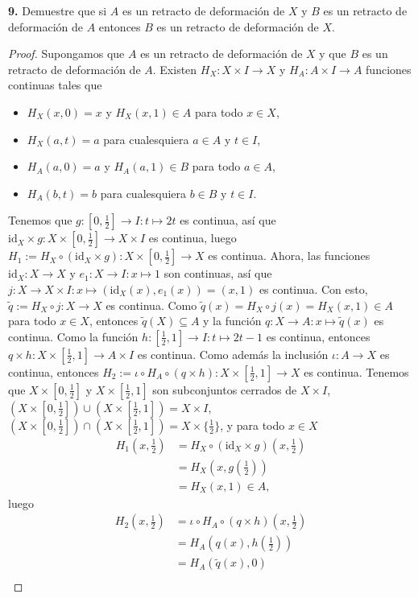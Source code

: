 \textbf{9.} Demuestre que si $A$ es un retracto de deformación de $X$ y $B$ es un retracto de deformación de $A$ entonces $B$ es un retracto de deformación de $X$.
\begin{proof}
Supongamos que $A$ es un retracto de deformación de $X$ y que $B$ es un retracto de deformación de $A$. Existen $H_X:X\times I\to X$ y $H_A:A\times I\to A$ funciones continuas tales que
\begin{itemize}
\item $H_X(x,0)=x$ y $H_X(x,1)\in A$ para todo $x\in X$,
\item $H_X(a,t)=a$ para cualesquiera $a\in A$ y $t\in I$,
\item $H_A(a,0)=a$ y $H_A(a,1)\in B$ para todo $a\in A$,
\item $H_A(b,t)=b$ para cualesquiera $b\in B$ y $t\in I$.
\end{itemize}
Tenemos que $g:[0,\tfrac12]\to I:t\mapsto 2t$ es continua, así que $\mathrm{id}_X\times g:X\times[0,\tfrac12]\to X\times I$ es continua, luego $H_1:=H_X\circ(\mathrm{id}_X\times g):X\times[0,\tfrac12]\to X$ es continua. Ahora, las funciones $\mathrm{id}_X:X\to X$ y $e_1:X\to I:x\mapsto 1$ son continuas, así que $j:X\to X\times I:x\mapsto(\mathrm{id}_X(x),e_1(x))=(x,1)$ es continua. Con esto, $\widetilde{q}:=H_X\circ j:X\to X$ es continua. Como $\widetilde{q}(x)=H_X\circ j(x)=H_X(x,1)\in A$ para todo $x\in X$, entonces $\widetilde{q}(X)\subseteq A$ y la función $q:X\to A:x\mapsto\widetilde{q}(x)$ es continua. Como la función $h:[\tfrac12,1]\to I:t\mapsto 2t-1$ es continua, entonces $q\times h:X\times[\tfrac12,1]\to A\times I$ es continua. Como además la inclusión $\iota:A\to X$ es continua, entonces $H_2:=\iota\circ H_A\circ(q\times h):X\times[\tfrac12,1]\to X$ es continua. Tenemos que $X\times[0,\tfrac12]$ y $X\times[\tfrac12,1]$ son subconjuntos cerrados de $X\times I$, $(X\times[0,\tfrac12])\cup(X\times[\tfrac12,1])=X\times I$, $(X\times[0,\tfrac12])\cap(X\times[\tfrac12,1])=X\times\{\tfrac12\}$, y para todo $x\in X$
\begin{align*}
H_1(x,\tfrac12)&=H_X\circ(\mathrm{id}_X\times g)(x,\tfrac12)\\
&=H_X(x,g(\tfrac12))\\
&=H_X(x,1)\in A,
\end{align*}
luego
\begin{align*}
H_2(x,\tfrac12)&=\iota\circ H_A\circ(q\times h)(x,\tfrac12)\\
&=H_A(q(x),h(\tfrac12))\\
&=H_A(\widetilde{q}(x),0)\\

\end{align*}
\end{proof}
